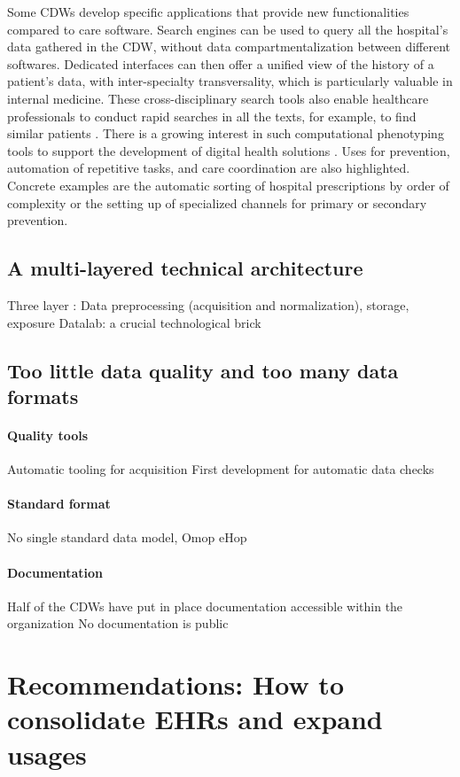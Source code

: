 \documentclass[french,12pt,twoside,a4paper]{book}
\begin{document}
Some CDWs develop specific applications that provide new functionalities
compared to care software. Search engines can be used to query all the
hospital's data gathered in the CDW, without data compartmentalization between
different softwares. Dedicated interfaces can then offer a unified view of the
history of a patient's data, with inter-specialty transversality, which is
particularly valuable in internal medicine. These cross-disciplinary search
tools also enable healthcare professionals to conduct rapid searches in all the
texts, for example, to find similar patients \citep{garcelon2017finding}.
%
There is a growing interest in such computational phenotyping tools to support
the development of digital health solutions \citep{wen2023impact}.
%
Uses for prevention, automation of repetitive tasks, and care coordination are
also highlighted. Concrete examples are the automatic sorting of hospital
prescriptions by order of complexity or the setting up of specialized channels
for primary or secondary prevention.

\subsection{A multi-layered technical
  architecture}\label{subsec:cdw:results:architecture} Three layer : Data
preprocessing (acquisition and normalization), storage, exposure Datalab: a
crucial technological brick

\subsection{Too little data quality and too many data
  formats}\label{subsec:cdw:results:data_quality}
\paragraph{Quality tools}
Automatic tooling for acquisition
First development for automatic data checks
\paragraph{Standard format}
No single standard data model,
Omop
eHop
\paragraph{Documentation}
Half of the CDWs have put in place documentation accessible within the organization
No documentation is public

\section{Recommendations: How to consolidate EHRs and expand
  usages}\label{sec:cdw:recommendations}
\end{document}
